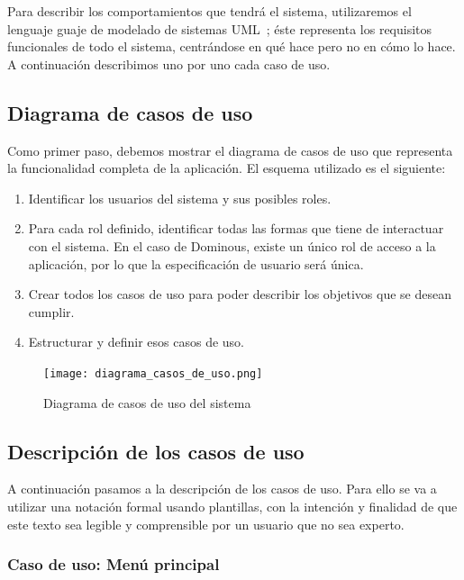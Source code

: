 Para describir los comportamientos que tendrá el sistema, utilizaremos el lenguaje guaje de modelado de sistemas UML~\cite{pressman};
éste representa los requisitos funcionales de todo el sistema, centrándose en qué hace pero no en cómo lo hace.\\

A continuación describimos uno por uno cada caso de uso.

\subsection{Diagrama de casos de uso}

Como primer paso, debemos mostrar el diagrama de casos de uso que representa la funcionalidad completa de la aplicación.
El esquema utilizado es el siguiente:
\begin{enumerate}
    \item Identificar los usuarios del sistema y sus posibles roles.
    \item Para cada rol definido, identificar todas las formas que tiene de interactuar con el sistema. En el caso
            de Dominous, existe un único rol de acceso a la aplicación, por lo que la especificación de usuario
            será única.
    \item Crear todos los casos de uso para poder describir los objetivos que se desean cumplir.
    \item Estructurar y definir esos casos de uso.
\end{enumerate}

\begin{figure}[h]
  \begin{center}
    \texttt{[image: diagrama\_casos\_de\_uso.png]}
  \end{center}
  \caption{Diagrama de casos de uso del sistema}
  \label{diagrama-casos-uso}
\end{figure}


\subsection{Descripción de los casos de uso}

A continuación pasamos a la descripción de los casos de uso. Para ello se va a utilizar una notación formal
usando plantillas, con la intención y finalidad de que este texto sea legible y comprensible por
un usuario que no sea experto.

\subsubsection{Caso de uso: Menú principal}

